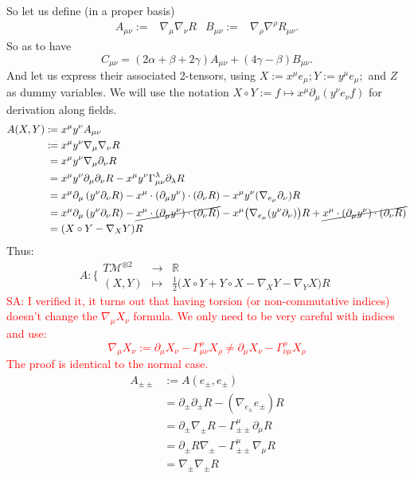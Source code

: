 \documentclass[a4paper,11pt]{article}
\numberwithin{equation}{section}
\theoremstyle{definition}
\newcommand{\SA}[1]{\textcolor{red}{SA: #1}}
\begin{document}
\noindent So let us define (in a proper basis)
\begin{align}
    A_{\mu\nu} :=& \nabla_\mu\nabla_\nu R&
    B_{\mu\nu} :=& \nabla_\rho\nabla^\rho R_{\mu\nu}.
\end{align}
So as to have 
\begin{equation}
    C_{\mu\nu} = (2\alpha + \beta + 2\gamma) A_{\mu\nu} +(4\gamma- \beta) B_{\mu\nu}.
\end{equation}
And let us express their associated 2-tensors, using $X:=x^\mu e_\mu; Y:=y^\mu e_\mu;$ and $Z$ as dummy variables. We will use the notation $X\circ Y:= f \mapsto x^\mu \partial_\mu (y^\nu e_\nu f)$ for derivation along fields.
\begin{align}
    A(X,Y) :\!\!&= x^\mu y^\nu A_{\mu\nu}\notag\\
    :\!\!&= x^\mu y^\nu \nabla_\mu \nabla_\nu R\notag\\
    &= x^\mu y^\nu \nabla_\mu \partial_\nu R\notag\\
    &= x^\mu y^\nu \partial_\mu \partial_\nu R - x^\mu y^\nu \Gamma_{\mu\nu}^\lambda \partial_\lambda R\notag\\
    &= x^\mu \partial_\mu \left(y^\nu \partial_\nu R \right) - x^\mu \cdot(\partial_\mu y^\nu) \cdot (\partial_\nu R) - x^\mu y^\nu (\nabla_{e_\mu} \partial_\nu)R\notag\\
    &= x^\mu \partial_\mu \left(y^\nu \partial_\nu R \right) - \cancel{x^\mu \cdot(\partial_\mu y^\nu) \cdot (\partial_\nu R)} - x^\mu \big(\nabla_{e_\mu} (y^\nu \partial_\nu)\big)R + \cancel{x^\mu \cdot (\partial_\mu y^\nu) \cdot (\partial_\nu R)}\notag\\
    &= (X\circ Y - \nabla_X Y) R
\end{align}
Thus:
\begin{equation}
    A : \Bigg\{\begin{matrix}
        T\mathcal{M}^{\otimes 2} & \to & \mathbb{R}\\
        (X,Y) & \mapsto & \frac{1}{2}\big(X\circ Y + Y\circ X - \nabla_X Y - \nabla_Y X\big) R
    \end{matrix}
\end{equation}
\SA{I verified it, it turns out that having torsion (or non-commutative indices) doesn't change the $\nabla_\mu X_\nu$ formula. We only need to be very careful with indices and use:
$$\nabla_\mu X_\nu := \partial_\mu X_\nu - \Gamma_{\mu\nu}^\rho X_\rho \ne \partial_\mu X_\nu - \Gamma_{\nu\mu}^\rho X_\rho$$
The proof is identical to the normal case.}
\begin{align*}
    A_{\pm\pm} &\!\!:= A(e_\pm,e_\pm)
    \\&= \partial_\pm \partial_\pm R - (\nabla_{e_\pm}e_\pm) R\\
    &= \partial_\pm \nabla_\pm R- \Gamma_{\pm\pm}^\mu \partial_\mu R\\
    &= \partial_\pm R \nabla_\pm- \Gamma_{\pm\pm}^\mu \nabla_\mu R\\
    &= \nabla_\pm \nabla_\pm R
\end{align*}
\end{document}
